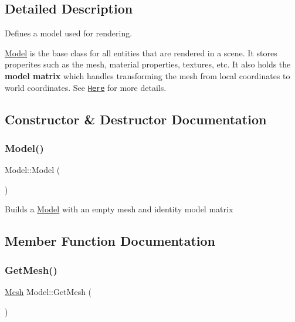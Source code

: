 \subsection{Detailed Description}
Defines a model used for rendering. 

\hyperlink{classModel}{Model} is the base class for all entities that are rendered in a scene. It stores properites such as the mesh, material properties, textures, etc. It also holds the {\bfseries model matrix} which handles transforming the mesh from local coordinates to world coordinates. See \href{https://learnopengl.com/#!Getting-started/Coordinate-Systems}{\tt Here} for more details. 

\subsection{Constructor \& Destructor Documentation}
\mbox{\label{classModel_ae3b375de5f6df4faf74a95d64748e048}} 
\subsubsection{\texorpdfstring{Model()}{Model()}}
{\footnotesize\ttfamily Model\+::\+Model (\begin{DoxyParamCaption}{ }\end{DoxyParamCaption})\hspace{0.3cm}{\ttfamily [protected]}}

Builds a \hyperlink{classModel}{Model} with an empty mesh and identity model matrix 

\subsection{Member Function Documentation}
\mbox{\label{classModel_a332f5a4ecf9bca582e583b3ff7784bf5}} 
\subsubsection{\texorpdfstring{Get\+Mesh()}{GetMesh()}}
{\footnotesize\ttfamily \hyperlink{classMesh}{Mesh} Model\+::\+Get\+Mesh (\begin{DoxyParamCaption}{ }\end{DoxyParamCaption})}

